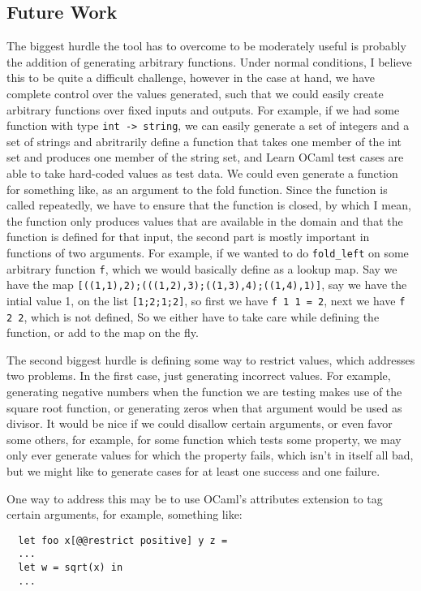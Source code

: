 \documentclass[11pt]{article}
\begin{document}
\subsection{Future Work}
The biggest hurdle the tool has to overcome to be moderately useful is probably the addition of generating arbitrary functions. Under normal conditions, I believe this to be quite a difficult challenge, however in the case at hand, we have complete control over the values generated, such that we could easily create arbitrary functions over fixed inputs and outputs. For example, if we had some function with type \verb+int -> string+, we can easily generate a set of integers and a set of strings and abritrarily define a function that takes one member of the int set and produces one member of the string set, and Learn OCaml test cases are able to take hard-coded values as test data. We could even generate a function for something like, as an argument to the fold function. Since the function is called repeatedly, we have to ensure that the function is closed, by which I mean, the function only produces values that are available in the domain and that the function is defined for that input, the second part is mostly important in functions of two arguments. For example, if we wanted to do \verb+fold_left+ on some arbitrary function \verb+f+, which we would basically define as a lookup map. Say we have the map \verb+[((1,1),2);(((1,2),3);((1,3),4);((1,4),1)]+, say we have the intial value 1, on the list \verb+[1;2;1;2]+, so first we have \verb+f 1 1 = 2+, next we have \verb+f 2 2+, which is not defined, So we either have to take care while defining the function, or add to the map on the fly. 

The second biggest hurdle is defining some way to restrict values, which addresses two problems. In the first case, just generating incorrect values. For example, generating negative numbers when the function we are testing makes use of the square root function, or generating zeros when that argument would be used as divisor. It would be nice if we could disallow certain arguments, or even favor some others, for example, for some function which tests some property, we may only ever generate values for which the property fails, which isn't in itself all bad, but we might like to generate cases for at least one success and one failure.

One way to address this may be to use OCaml's attributes extension to tag certain arguments, for example, something like:

\begin{lstlisting}
  let foo x[@@restrict positive] y z =
  ...
  let w = sqrt(x) in
  ...
\end{lstlisting}
\end{document}
